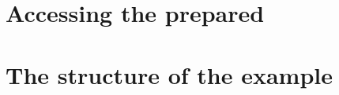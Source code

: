 %


\section{Accessing the prepared \gdproject}


\section{The structure of the example \gdproject}



